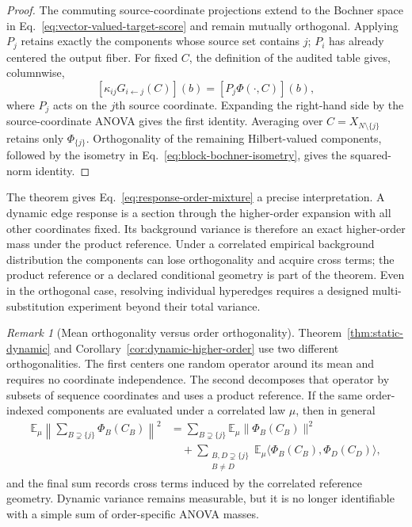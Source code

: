 \documentclass[10pt]{article}
\newcommand{\E}{\mathbb E}
\theoremstyle{definition}
\theoremstyle{remark}
\newtheorem{remark}[theorem]{Remark}
\begin{document}
\begin{proof}
The commuting source-coordinate projections extend to the Bochner space in
Eq.~\ref{eq:vector-valued-target-score} and remain mutually orthogonal.  Applying $P_j$ retains
exactly the components whose source set contains $j$; $P_i$ has already centered the output fiber.
For fixed $C$, the definition of the audited table gives, columnwise,
\begin{equation}
\left[\kappa_{ij}G_{i\leftarrow j}(C)\right](b)
=\left[P_j\Phi(\mathord\cdot,C)\right](b),
\end{equation}
where $P_j$ acts on the $j$th source coordinate.  Expanding the right-hand side by the
source-coordinate ANOVA gives the first identity.  Averaging over
$C=X_{N\setminus\{j\}}$ retains only $\Phi_{\{j\}}$.  Orthogonality of the remaining
Hilbert-valued components, followed by the isometry in
Eq.~\ref{eq:block-bochner-isometry}, gives the squared-norm identity.
\end{proof}

The theorem gives Eq.~\ref{eq:response-order-mixture} a precise interpretation.  A dynamic edge
response is a section through the higher-order expansion with all other coordinates fixed.  Its
background variance is therefore an exact higher-order mass under the product reference.  Under a
correlated empirical background distribution the components can lose orthogonality and acquire
cross terms; the product reference or a declared conditional geometry is part of the theorem.
Even in the orthogonal case, resolving individual hyperedges requires a designed
multi-substitution experiment beyond their total variance.

\begin{remark}[Mean orthogonality versus order orthogonality]
Theorem~\ref{thm:static-dynamic} and Corollary~\ref{cor:dynamic-higher-order} use two different
orthogonalities.  The first centers one random operator around its mean and requires no coordinate
independence.  The second decomposes that operator by subsets of sequence coordinates and uses a
product reference.  If the same order-indexed components are evaluated under a correlated law
$\mu$, then in general
\begin{equation}
\begin{aligned}
\E_{\mu}\left\|\sum_{B\supsetneq\{j\}}\Phi_B(C_B)\right\|^2
&=\sum_{B\supsetneq\{j\}}\E_{\mu}\|\Phi_B(C_B)\|^2\\
&\quad+\sum_{\substack{B,D\supsetneq\{j\}\\B\ne D}}
\E_{\mu}\langle \Phi_B(C_B),\Phi_D(C_D)\rangle,
\end{aligned}
\label{eq:correlated-anova-cross-terms}
\end{equation}
and the final sum records cross terms induced by the correlated reference geometry.  Dynamic
variance remains measurable, but it is no longer identifiable with a simple sum of order-specific
ANOVA masses.
\end{remark}
\end{document}
